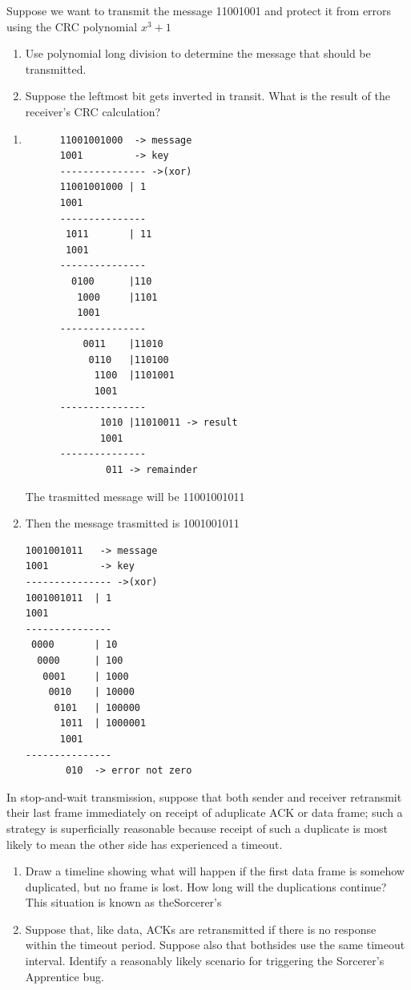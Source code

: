 \documentclass{assignment}
\begin{document}
\newpage

\begin{ex}
Suppose we want to transmit the message 11001001 and protect it from errors using the CRC 
polynomial $x^3 + 1$
\begin{enumerate}
  \item  Use polynomial long division to determine the message that should be transmitted.
  \item Suppose the leftmost bit gets inverted in transit. What is the result of the receiver's CRC calculation? 
\end{enumerate}
\end{ex}
\begin{enumerate}
  \item 
  \begin{lstlisting}
      11001001000  -> message 
      1001         -> key
      --------------- ->(xor)
      11001001000 | 1
      1001 
      ---------------
       1011       | 11
       1001 
      ---------------
        0100      |110
         1000     |1101
         1001      
      ---------------
          0011    |11010
           0110   |110100
            1100  |1101001
            1001
      ---------------
             1010 |11010011 -> result
             1001
      ---------------
              011 -> remainder

  \end{lstlisting}
  The trasmitted message will be 11001001011
\item Then the message trasmitted is 1001001011

  \begin{lstlisting}
1001001011   -> message 
1001         -> key
--------------- ->(xor)
1001001011  | 1
1001 
---------------
 0000       | 10
  0000      | 100
   0001     | 1000
    0010    | 10000
     0101   | 100000
      1011  | 1000001
      1001  
---------------
       010  -> error not zero
  \end{lstlisting}
\end{enumerate}
\newpage 
\begin{ex}
  In stop-and-wait transmission, suppose that both sender and receiver retransmit their last frame 
immediately on receipt of aduplicate ACK or data frame; such a strategy is superficially reasonable 
because receipt of such a duplicate is most likely to mean the other side has experienced a timeout.
\begin{enumerate}
  \item Draw a timeline showing what will happen if the first data frame is somehow duplicated, but no 
frame is lost. How long will the duplications continue? This situation is known as theSorcerer’s 
\item Suppose that, like data, ACKs are retransmitted if there is no response within the timeout period. 
Suppose also that bothsides use the same timeout interval. Identify a reasonably likely scenario for 
triggering the Sorcerer’s Apprentice bug.
\end{enumerate}
\end{ex}
\end{document}
